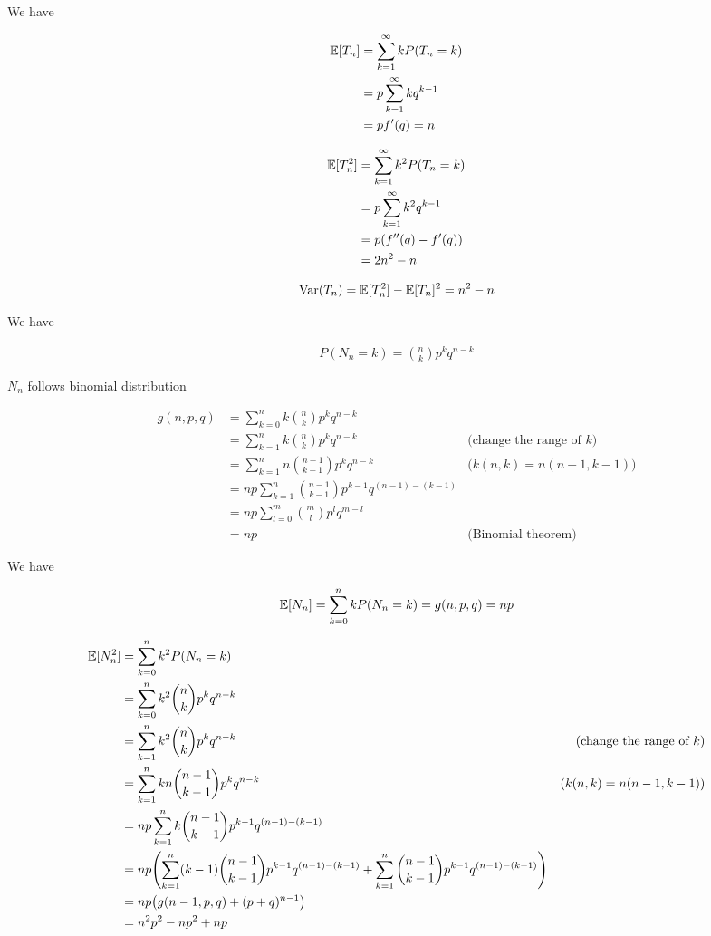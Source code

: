 \documentclass{article}
\begin{document}
We have

\begin{align*}
    \mathbb{E}[T_n]
    &= \sum_{k=1}^\infty k P(T_n = k) \\
    &= p \sum_{k=1}^\infty k q^{k-1}  \\
    &= p f'(q) = n
\end{align*}


\begin{align*}
    \Exp[T_n^2]
    &= \sum_{k=1}^\infty k^2 P(T_n = k) \\
    &= p \sum_{k=1}^\infty k^2 q^{k-1}  \\
    &= p \tuple*{ f''(q) - f'(q) } \\
    &= 2n^2 - n
\end{align*}

$$
    \operatorname{Var}(T_n) = \mathbb{E}[T_n^2] - \mathbb{E}[T_n]^2 = n^2 - n
$$

We have

\begin{align*}
    P(N_n = k) = {n \choose k} p^k q^{n-k}
\end{align*}

$N_n$ follows binomial distribution

\begin{lemma}[binomial]
\begin{align*}
    g(n, p, q)
    &= \sum_{k=0}^n k {n \choose k} p^k q^{n-k} \\
    &= \sum_{k=1}^n k {n \choose k} p^k q^{n-k} &\text{(change the range of $k$)}\\
    &= \sum_{k=1}^n n {n-1 \choose k-1} p^k q^{n-k} &\text{($k (n, k) = n (n-1, k-1)$)} \\
    &= np \sum_{k=1}^n {n-1 \choose k-1} p^{k-1} q^{(n-1) - (k-1)} \\
    &= np \sum_{l=0}^m {m \choose l} p^l q^{m-l} \\
    &= np &\text{(Binomial theorem)}
\end{align*}
\end{lemma}

We have

\begin{align*}
    \mathbb{E}[N_n] = \sum_{k=0}^n k P(N_n = k) = g(n, p, q) = np
\end{align*}

\begin{align*}
    \Exp[N_n^2]
    &= \sum_{k=0}^n k^2 P(N_n = k) \\
    &= \sum_{k=0}^n k^2 {n \choose k} p^k q^{n-k} \\
    &= \sum_{k=1}^n k^2 {n \choose k} p^k q^{n-k} &\text{(change the range of $k$)} \\
    &= \sum_{k=1}^n kn {n-1 \choose k-1} p^k q^{n-k} &\text{($k (n, k) = n (n-1, k-1)$)} \\
    &= np \sum_{k=1}^n k {n-1 \choose k-1} p^{k-1} q^{(n-1) - (k-1)} \\
    &= np \tuple*{\sum_{k=1}^n (k-1) {n-1 \choose k-1} p^{k-1} q^{(n-1) - (k-1)} + \sum_{k=1}^n {n-1 \choose k-1} p^{k-1} q^{(n-1) - (k-1)} }\\
    &= np \tuple*{g(n-1, p, q) + (p+q)^{n-1}} \\
    &= n^2 p^2 - n p^2 + np
\end{align*}
\end{document}

